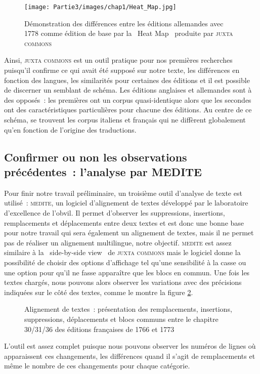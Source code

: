 \begin{figure}[H]
    \centering
    \texttt{[image: Partie3/images/chap1/Heat\_Map.jpg]}
    \caption{Démonstration des différences entre les éditions allemandes avec 1778 comme édition de base par la \og~Heat Map~\fg{} produite par \textsc{juxta commons}}
    \label{fig:heat_map}
\end{figure}
Ainsi, \textsc{juxta commons} est un outil pratique pour nos premières recherches puisqu'il confirme ce qui avait été supposé sur notre texte, les différences en fonction des langues, les similarités pour certaines des éditions et il est possible de discerner un semblant de schéma. Les éditions anglaises et allemandes sont à des opposés~: les premières ont un corpus quasi-identique alors que les secondes ont des caractéristiques particulières pour chacune des éditions. Au centre de ce schéma, se trouvent les corpus italiens et français qui ne diffèrent globalement qu'en fonction de l'origine des traductions.

\subsection{Confirmer ou non les observations précédentes~: l'analyse par MEDITE}
Pour finir notre travail préliminaire, un troisième outil d'analyse de texte est utilisé~: \textsc{medite}, un logiciel d'alignement de textes développé par le laboratoire d'excellence de l'\acrfull{obvil}. Il permet d'observer les suppressions, insertions, remplacements et déplacements entre deux textes et est donc une bonne base pour notre travail qui sera également un alignement de textes, mais il ne permet pas de réaliser un alignement multilingue, notre objectif. \textsc{medite} est assez similaire à la \og~side-by-side view~\fg{} de \textsc{juxta commons} mais le logiciel donne la possibilité de choisir des options d'affichage tel qu'une sensibilité à la casse ou une option pour qu'il ne fasse apparaître que les blocs en commun. Une fois les textes chargés, nous pouvons alors observer les variations avec des précisions indiquées sur le côté des textes, comme le montre la figure \ref{fig:medite}.
\begin{figure}[H]
    \centering
    \caption{Alignement de textes~: présentation des remplacements, insertions, suppressions, déplacements et blocs communs entre le chapitre 30/31/36 des éditions françaises de 1766 et 1773}
    \label{fig:medite}
\end{figure}
L'outil est assez complet puisque nous pouvons observer les numéros de lignes où apparaissent ces changements, les différences quand il s'agit de remplacements et même le nombre de ces changements pour chaque catégorie.

